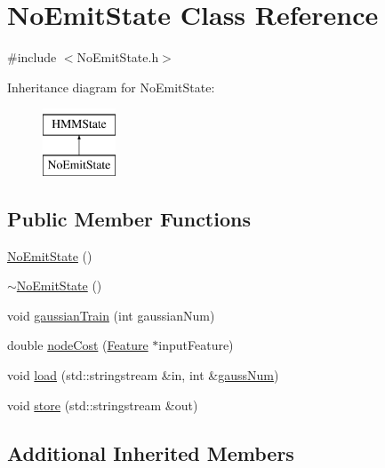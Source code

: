 \hypertarget{class_no_emit_state}{\section{No\+Emit\+State Class Reference}
\label{class_no_emit_state}
}


{\ttfamily \#include $<$No\+Emit\+State.\+h$>$}

Inheritance diagram for No\+Emit\+State\+:\begin{figure}[H]
\begin{center}
\leavevmode
\includegraphics[height=2.000000cm]{class_no_emit_state}
\end{center}
\end{figure}
\subsection*{Public Member Functions}
\begin{DoxyCompactItemize}
\item 
\hyperlink{class_no_emit_state_a8c1093d8268fc7cedf6ac01b023f0298}{No\+Emit\+State} ()
\item 
\hyperlink{class_no_emit_state_a6d9f43ba8c4d9a21d6c5ac775eff7f54}{$\sim$\+No\+Emit\+State} ()
\item 
void \hyperlink{class_no_emit_state_acb0904c7b81e54bbfa8a995e1acd47bd}{gaussian\+Train} (int gaussian\+Num)
\item 
double \hyperlink{class_no_emit_state_a37853ca0ea0cffe47d4bacf6c9f4ea3d}{node\+Cost} (\hyperlink{class_feature}{Feature} $\ast$input\+Feature)
\item 
void \hyperlink{class_no_emit_state_a59702d5b1bb81733c2694fe1fa80a8e6}{load} (std\+::stringstream \&in, int \&\hyperlink{pro6__demo_8cpp_a923ffcfa3c56ccdba17bc4e700247d54}{gauss\+Num})
\item 
void \hyperlink{class_no_emit_state_afbe040ba5781ef6cf4f2544cb3756962}{store} (std\+::stringstream \&out)
\end{DoxyCompactItemize}
\subsection*{Additional Inherited Members}


